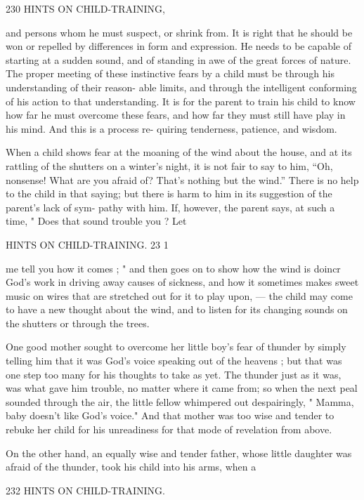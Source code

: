 \documentclass[
]{book}
\begin{document}
230 HINTS ON CHILD-TRAINING,

and persons whom he must suspect, or shrink from. It is right that he should be won or repelled by differences in form and expression. He needs to be capable of starting at a sudden sound, and of standing in awe of the great forces of nature. The proper meeting of these instinctive fears by a child must be through his understanding of their reason- able limits, and through the intelligent conforming of his action to that understanding. It is for the parent to train his child to know how far he must overcome these fears, and how far they must still have play in his mind. And this is a process re- quiring tenderness, patience, and wisdom.

When a child shows fear at the moaning of the wind about the house, and at its rattling of the shutters on a winter's night, it is not fair to say to him, ``Oh, nonsense! What are you afraid of? That's nothing but the wind.'' There is no help to the child in that saying; but there is harm to him in its suggestion of the parent's lack of sym- pathy with him. If, however, the parent says, at such a time, " Does that sound trouble you ? Let

HINTS ON CHILD-TRAINING. 23 1

me tell you how it comes ; " and then goes on to show how the wind is doincr God's work in driving away causes of sickness, and how it sometimes makes sweet music on wires that are stretched out for it to play upon, --- the child may come to have a new thought about the wind, and to listen for its changing sounds on the shutters or through the trees.

One good mother sought to overcome her little boy's fear of thunder by simply telling him that it was God's voice speaking out of the heavens ; but that was one step too many for his thoughts to take as yet. The thunder just as it was, was what gave him trouble, no matter where it came from; so when the next peal sounded through the air, the little fellow whimpered out despairingly, " Mamma, baby doesn't like God's voice." And that mother was too wise and tender to rebuke her child for his unreadiness for that mode of revelation from above.

On the other hand, an equally wise and tender father, whose little daughter was afraid of the thunder, took his child into his arms, when a

232 HINTS ON CHILD-TRAINING.
\end{document}
